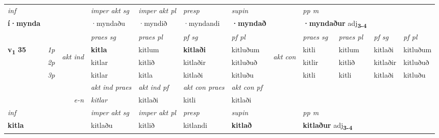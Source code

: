\begin{longtable}[l]{X>{\footnotesize\itshape}llXXXXlXXXX}
   {\textit{inf}} & &  & \textit{imper akt sg} & \textit{imper akt pl}   & \textit{presp} & \textit{supin}  && \textit{pp m} \\*
  {\textbf{í\allowbreak ·mynda}} & && ·myndaðu  & ·myndið   & ·myndandi &  \textbf{·myndað}  && \multicolumn{2}{l}{\textbf{·myndaður} adj\textbf{\textsubscript{3-4}}} \\*

\midrule

 & &   & \textit{praes sg}  & \textit{praes pl}    & \textit{ pf sg} & \textit{pf pl} & & \textit{praes sg}  & \textit{praes pl}    & \textit{pf sg} & \textit{pf pl }  \\ \cmidrule{4-7} \cmidrule{9-12}
 \multirow{2}{*}{{{\textbf{v{\textsubscript{1}}} \Large{\textbf{35}}}}}  & 1p & \multirow{3}{*}{\begin{turn}{90}\textit{akt ind}\end{turn}} & \textbf{kitla} & kitlum & \textbf{kitlaði} & kitluðum & \multirow{3}{*}{\begin{turn}{90}\textit{akt con}\end{turn}} &kitli & kitlum & kitlaði & kitluðum\\*
 & 2p &  &  kitlar  & kitlið & kitlaðir & kitluðuð & & kitlir & kitlið & kitlaðir & kitluðuð \\*
 & 3p &  & kitlar & kitla & kitlaði & kitluðu & & kitli & kitli& kitlaði & kitluðu \\*
\cmidrule{4-7} \cmidrule{9-12}

   && &  \textit{akt ind praes} & \textit{akt ind pf} & \textit{akt con praes} & \textit{akt con pf} \\*
\multicolumn{3}{r}{\textit{e-n}} & kitlar & kitlaði & kitli & kitlaði \\*

\cmidrule{4-7}
   {\textit{inf}} & &  & \textit{imper akt sg} & \textit{imper akt pl}   & \textit{presp} & \textit{supin}  && \textit{pp m} \\*
  {\textbf{kitla}} & && kitlaðu  & kitlið   & kitlandi &  \textbf{kitlað}  && \multicolumn{2}{l}{\textbf{kitlaður} adj\textbf{\textsubscript{3-4}}} \\*

\midrule


\end{longtable}
